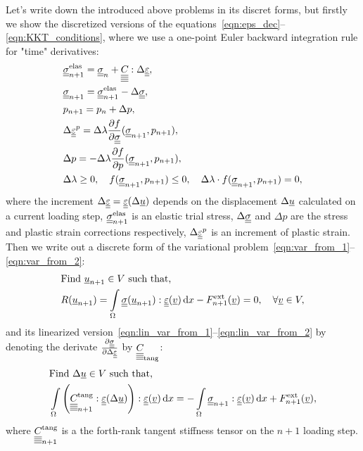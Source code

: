 \documentclass[12pt]{article}
\begin{document}
Let's write down the introduced above problems in its discret forms, but firstly we show the discretized versions of the equations~\eqref{eqn:eps_dec}--\eqref{eqn:KKT_conditions}, where we use a one-point Euler backward integration rule for "time" derivatives:
\begin{align}
    & \uusigmanelas = \uusigma_n + \uuuuC{} : \Delta\uueps \label{eqn:return_mapping_begin},\\
    & \uusigman = \uusigmanelas - \Delta\uusigma, \\
    & p_{n+1} = p_n + \Delta p, \\%
    & \Delta\uueps^p = \Delta\lambda\frac{\partial f}{\partial \uusigma} (\uusigman, p_{n+1}), \\
    & \Delta p = -\Delta\lambda\frac{\partial f}{\partial p} (\uusigman, p_{n+1}), \\
    & \Delta\lambda \geq 0, \quad f(\uusigman, p_{n+1}) \leq 0, \quad \Delta\lambda\cdot f(\uusigman, p_{n+1}) = 0, \label{eqn:return_mapping_end}
\end{align}
where the increment $\Delta\underline{\underline{\varepsilon}} = \underline{\underline{\varepsilon}}(\Delta\underline{u})$ depends on the displacement $\Delta\underline{u}$ calculated on a current loading step, $\underline{\underline{\sigma}}_{n+1}^{\text{elas}}$ is an elastic trial stress, $\Delta\underline{\underline{\sigma}}$ and $\Delta p$ are the stress and plastic strain corrections respectively, $\Delta\underline{\underline{\varepsilon}}^p$ is an increment of plastic strain. 
Then we write out a discrete form of the variational problem~\eqref{eqn:var_from_1}--\eqref{eqn:var_from_2}:
\begin{align}
    & \text{Find } \underline{u}_{n+1} \in V \text{ such that,} \label{eqn:var_disc_from_1} \\ 
    & R(\underline{u}_{n+1}) = \int\limits_\Omega\underline{\underline{\sigma}}(\underline{u}_{n+1}) : \underline{\underline{\varepsilon}}(\underline{v}) \, \mathrm{d} x - F_{n+1}^\text{ext}(\underline{v}) = 0, \quad \forall \underline{v} \in V \label{eqn:var_disc_from_2},
\end{align}
and its linearized version~\eqref{eqn:lin_var_from_1}--\eqref{eqn:lin_var_from_2} by denoting the derivate $\frac{\partial\underline{\underline{\sigma}}}{\partial\Delta\underline{\underline{\varepsilon}}}$ by $\underline{\underline{\underline{\underline{C_{}}}}}_{\text{tang}}$:
\begin{align}
    & \text{Find } \Delta\underline{u} \in V \text{ such that,} \label{eqn:lin_var_disc_from_1} \\ 
    & \int\limits_\Omega \left(\underline{\underline{\underline{\underline{C_{}}}}}_{n+1}^\text{tang} : \underline{\underline{\varepsilon}}(\Delta\underline{u})\right) : \underline{\underline{\varepsilon}}(\underline{v}) \, \mathrm{d} x = -\int\limits_\Omega\underline{\underline{\sigma}}_{n+1} : \underline{\underline{\varepsilon}}(\underline{v}) \, \mathrm{d} x + F^\text{ext}_{n+1}(\underline{v}) \label{eqn:lin_var_disc_from_2},
\end{align}
where $\underline{\underline{\underline{\underline{C_{}}}}}_{n+1}^{\text{tang}}$ is a the forth-rank tangent stiffness tensor on the $n+1$ loading step.
\end{document}
